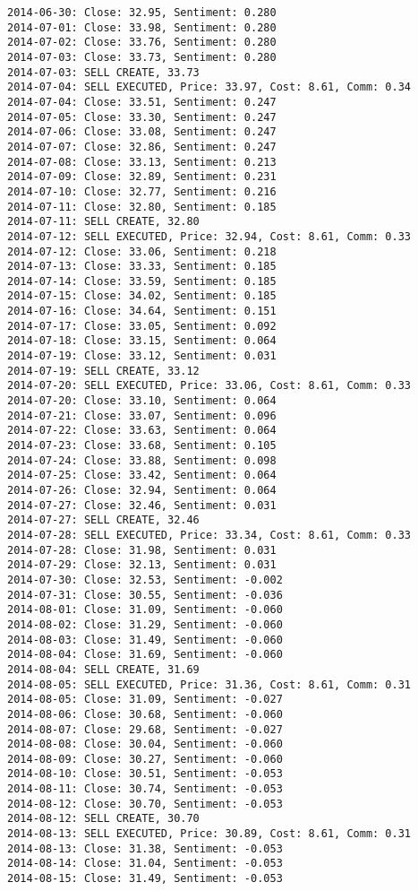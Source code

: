 \documentclass[11pt]{article}
\begin{document}
\begin{Verbatim}[commandchars=\\\{\}]
2014-06-30: Close: 32.95, Sentiment: 0.280
2014-07-01: Close: 33.98, Sentiment: 0.280
2014-07-02: Close: 33.76, Sentiment: 0.280
2014-07-03: Close: 33.73, Sentiment: 0.280
2014-07-03: SELL CREATE, 33.73
2014-07-04: SELL EXECUTED, Price: 33.97, Cost: 8.61, Comm: 0.34
2014-07-04: Close: 33.51, Sentiment: 0.247
2014-07-05: Close: 33.30, Sentiment: 0.247
2014-07-06: Close: 33.08, Sentiment: 0.247
2014-07-07: Close: 32.86, Sentiment: 0.247
2014-07-08: Close: 33.13, Sentiment: 0.213
2014-07-09: Close: 32.89, Sentiment: 0.231
2014-07-10: Close: 32.77, Sentiment: 0.216
2014-07-11: Close: 32.80, Sentiment: 0.185
2014-07-11: SELL CREATE, 32.80
2014-07-12: SELL EXECUTED, Price: 32.94, Cost: 8.61, Comm: 0.33
2014-07-12: Close: 33.06, Sentiment: 0.218
2014-07-13: Close: 33.33, Sentiment: 0.185
2014-07-14: Close: 33.59, Sentiment: 0.185
2014-07-15: Close: 34.02, Sentiment: 0.185
2014-07-16: Close: 34.64, Sentiment: 0.151
2014-07-17: Close: 33.05, Sentiment: 0.092
2014-07-18: Close: 33.15, Sentiment: 0.064
2014-07-19: Close: 33.12, Sentiment: 0.031
2014-07-19: SELL CREATE, 33.12
2014-07-20: SELL EXECUTED, Price: 33.06, Cost: 8.61, Comm: 0.33
2014-07-20: Close: 33.10, Sentiment: 0.064
2014-07-21: Close: 33.07, Sentiment: 0.096
2014-07-22: Close: 33.63, Sentiment: 0.064
2014-07-23: Close: 33.68, Sentiment: 0.105
2014-07-24: Close: 33.88, Sentiment: 0.098
2014-07-25: Close: 33.42, Sentiment: 0.064
2014-07-26: Close: 32.94, Sentiment: 0.064
2014-07-27: Close: 32.46, Sentiment: 0.031
2014-07-27: SELL CREATE, 32.46
2014-07-28: SELL EXECUTED, Price: 33.34, Cost: 8.61, Comm: 0.33
2014-07-28: Close: 31.98, Sentiment: 0.031
2014-07-29: Close: 32.13, Sentiment: 0.031
2014-07-30: Close: 32.53, Sentiment: -0.002
2014-07-31: Close: 30.55, Sentiment: -0.036
2014-08-01: Close: 31.09, Sentiment: -0.060
2014-08-02: Close: 31.29, Sentiment: -0.060
2014-08-03: Close: 31.49, Sentiment: -0.060
2014-08-04: Close: 31.69, Sentiment: -0.060
2014-08-04: SELL CREATE, 31.69
2014-08-05: SELL EXECUTED, Price: 31.36, Cost: 8.61, Comm: 0.31
2014-08-05: Close: 31.09, Sentiment: -0.027
2014-08-06: Close: 30.68, Sentiment: -0.060
2014-08-07: Close: 29.68, Sentiment: -0.027
2014-08-08: Close: 30.04, Sentiment: -0.060
2014-08-09: Close: 30.27, Sentiment: -0.060
2014-08-10: Close: 30.51, Sentiment: -0.053
2014-08-11: Close: 30.74, Sentiment: -0.053
2014-08-12: Close: 30.70, Sentiment: -0.053
2014-08-12: SELL CREATE, 30.70
2014-08-13: SELL EXECUTED, Price: 30.89, Cost: 8.61, Comm: 0.31
2014-08-13: Close: 31.38, Sentiment: -0.053
2014-08-14: Close: 31.04, Sentiment: -0.053
2014-08-15: Close: 31.49, Sentiment: -0.053

\end{Verbatim}
\end{document}
